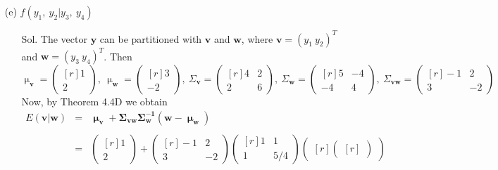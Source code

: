 \documentclass[12pt]{article} %
\begin{document}
\begin{enumerate}
\begin{enumerate}
		\item[(e)] $f(y_{1},~y_{2} | y_{3},~y_{4})$
			\begin{enumerate}
				\item[Sol.] The vector $\mathbf{y}$ can be partitioned with $\mathbf{v}$ and $\mathbf{w}$,
				where $\mathbf{v}=(y_{1}~y_{2})^T$ and $\mathbf{w}=(y_{3}~y_{4})^T$. Then 
				\begin{equation*}
					\upmu_{\mathbf{v}}=
						\begin{pmatrix}[r]
						1 \\
						2
						\end{pmatrix},~
					\upmu_{\mathbf{w}}=
						\begin{pmatrix}[r]
						3 \\
						-2
						\end{pmatrix},~
					\Sigma_{\mathbf{v}}=
						\begin{pmatrix}[r]
							4 & 2 \\
							2 & 6
						\end{pmatrix},~
					\Sigma_{\mathbf{w}}=
						\begin{pmatrix}[r]
							5 & -4 \\
						   -4 &  4 
						\end{pmatrix},~
					\Sigma_{\mathbf{vw}}=								
						\begin{pmatrix}[r]
							-1 &  2 \\
							3  & -2
						\end{pmatrix}													
				\end{equation*}
				Now, by Theorem 4.4D we obtain
				\begin{eqnarray*}
					E(\mathbf{v}|\mathbf{w})&=&
					\mathbf{\upmu_{\mathbf{v}}+\Sigma_{\mathbf{vw}}\Sigma_{\mathbf{w}}^{-1}(\mathbf{w}-\upmu_{\mathbf{w}})}\\
					\\
					&=&
					\begin{pmatrix}[r]
					1 \\
					2 
					\end{pmatrix}+
					\begin{pmatrix}[r]
					-1 & 2 \\
					3  &-2 
					\end{pmatrix}					
					\begin{pmatrix}[r]
					1 & 1	\\
					1 & 5/4
					\end{pmatrix}
					\begin{pmatrix}[r]										
						\begin{pmatrix}[r]

\end{pmatrix}
\end{pmatrix}
\end{eqnarray*}
\end{enumerate}
\end{enumerate}
\end{enumerate}
\end{document}
